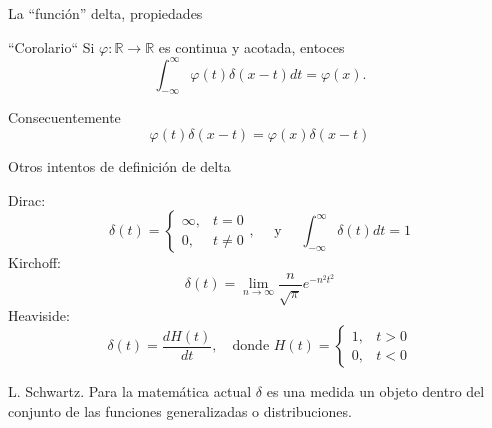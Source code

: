 \documentclass[xcolor=dvipsnames,a4paper,10pt,handout]{beamer}
\begin{document}
\begin{frame}{La ``función'' delta, propiedades  }

  \begin{block}{``Corolario``}
 Si $\varphi:\mathbb{R}\to\mathbb{R}$ es continua y acotada, entoces
 \[
  \int_{-\infty}^{\infty}\varphi(t)\delta(x-t)dt=\varphi(x).
 \]
 
 Consecuentemente
 \begin{equation}\label{eq:prop_delta}
 \varphi(t) \delta(x-t)=\varphi(x) \delta(x-t)
 \end{equation}


\end{block}




\end{frame}


\begin{frame}{Otros intentos de definición de delta }

Dirac:
$$
\delta(t)= \begin{cases}\infty, & t=0 \\ 0, & t \neq 0\end{cases},\quad\text{ y }\quad 
\int_{-\infty}^{\infty} \delta(t) d t=1
$$
Kirchoff: 
$$
\delta(t)=\lim _{n \rightarrow \infty} \frac{n}{\sqrt{\pi}} e^{-n^2 t^2}
$$
Heaviside:
$$
\delta(t)=\frac{d H(t)}{d t} ,\quad\text{donde } H(t)= \begin{cases}1, & t>0 \\ 0, & t<0\end{cases}
$$

L. Schwartz. Para la matemática actual $\delta$ es una medida un objeto dentro del conjunto de las funciones generalizadas o distribuciones.
\end{frame}


 
\end{document}
